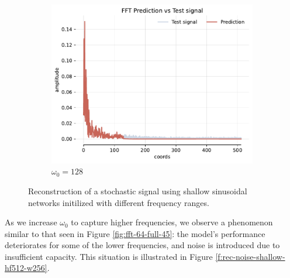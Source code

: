 \begin{figure}[h]
\begin{subfigure}[b]{0.32\textwidth}
        \centering
        \includegraphics[width=\textwidth]{img/ch3/fft-noise-h0-w128.pdf}
        \caption{$\omega_0=128$}
        \label{fig:fft-noise-shallow-w128}
    \end{subfigure}
    \caption{Reconstruction of a stochastic signal using shallow sinusoidal networks initilized with different frequency ranges.}
    \label{f:rec-noise-shallow}
\end{figure}

As we increase $\omega_0$ to capture higher frequencies, we observe a phenomenon similar to that seen in Figure \ref{fig:fft-64-full-45}: the model's performance deteriorates for some of the lower frequencies, and noise is introduced due to insufficient capacity. This situation is illustrated in Figure \ref{f:rec-noise-shallow-hf512-w256}.

